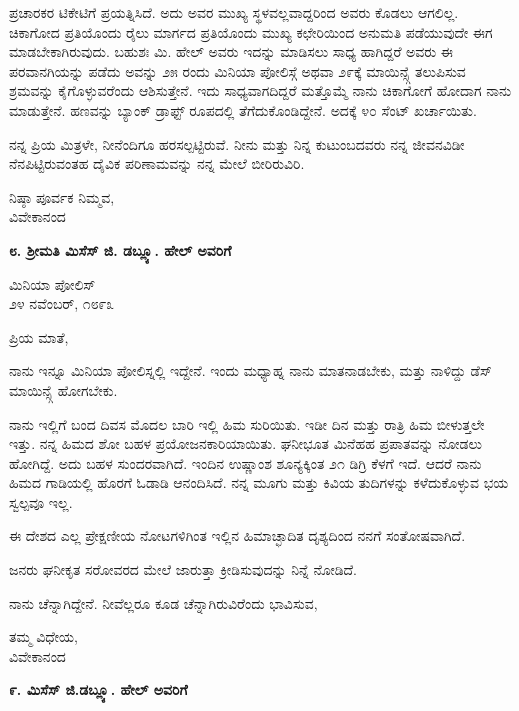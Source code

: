 ಪ್ರಚಾರಕರ ಟಿಕೇಟಿಗೆ ಪ್ರಯತ್ನಿಸಿದೆ. ಅದು ಅವರ ಮುಖ್ಯ ಸ್ಥಳವಲ್ಲವಾದ್ದರಿಂದ ಅವರು ಕೊಡಲು ಆಗಲಿಲ್ಲ. ಚಿಕಾಗೋದ ಪ್ರತಿಯೊಂದು ರೈಲು ಮಾರ್ಗದ ಪ್ರತಿಯೊಂದು ಮುಖ್ಯ ಕಛೇರಿಯಿಂದ ಅನುಮತಿ ಪಡೆಯುವುದೇ ಈಗ ಮಾಡಬೇಕಾಗಿರುವುದು. ಬಹುಶಃ ಮಿ. ಹೇಲ್ ಅವರು ಇದನ್ನು ಮಾಡಿಸಲು ಸಾಧ್ಯ ಹಾಗಿದ್ದರೆ ಅವರು ಈ ಪರವಾನಗಿಯನ್ನು ಪಡೆದು ಅವನ್ನು ೨೫ ರಂದು ಮಿನಿಯಾ ಪೋಲಿಸ್ಗೆ ಅಥವಾ ೨೯ಕ್ಕೆ ಮಾಯಿನ್ಸ್ಗೆ ತಲುಪಿಸುವ ಶ್ರಮವನ್ನು ಕೈಗೊಳ್ಳುವರೆಂದು ಆಶಿಸುತ್ತೇನೆ. ಇದು ಸಾಧ್ಯವಾಗದಿದ್ದರೆ ಮತ್ತೊಮ್ಮೆ ನಾನು ಚಿಕಾಗೋಗೆ ಹೋದಾಗ ನಾನು ಮಾಡುತ್ತೇನೆ. ಹಣವನ್ನು ಬ್ಯಾಂಕ್ ಡ್ರಾಫ್ಟ್ ರೂಪದಲ್ಲಿ ತೆಗೆದುಕೊಂಡಿದ್ದೇನೆ. ಅದಕ್ಕೆ ೪೦ ಸೆಂಟ್ ಖರ್ಚಾಯಿತು.

ನನ್ನ ಪ್ರಿಯ ಮಿತ್ರಳೇ, ನೀನೆಂದಿಗೂ ಹರಸಲ್ಪಟ್ಟಿರುವೆ. ನೀನು ಮತ್ತು ನಿನ್ನ ಕುಟುಂಬದವರು ನನ್ನ ಜೀವನವಿಡೀ ನೆನಪಿಟ್ಟಿರುವಂತಹ ದೈವಿಕ ಪರಿಣಾಮವನ್ನು ನನ್ನ ಮೇಲೆ ಬೀರಿರುವಿರಿ.

\begin{flushright}
ನಿಷ್ಠಾ ಪೂರ್ವಕ ನಿಮ್ಮವ,\\ವಿವೇಕಾನಂದ
\end{flushright}

\begin{center}
\textbf{೮. ಶ‍್ರೀಮತಿ ಮಿಸೆಸ್ ಜಿ. ಡಬ್ಲ್ಯೂ. ಹೇಲ್ ಅವರಿಗೆ}
\end{center}

\begin{flushright}
ಮಿನಿಯಾ ಪೋಲಿಸ್\\೨೪ ನವೆಂಬರ್, ೧೮೯೩
\end{flushright}

ಪ್ರಿಯ ಮಾತೆ,

ನಾನು ಇನ್ನೂ ಮಿನಿಯಾ ಪೋಲಿಸ್ನಲ್ಲಿ ಇದ್ದೇನೆ. ಇಂದು ಮಧ್ಯಾಹ್ನ ನಾನು ಮಾತನಾಡಬೇಕು, ಮತ್ತು ನಾಳಿದ್ದು ಡೆಸ್ ಮಾಯಿನ್ಸ್ಗೆ ಹೋಗಬೇಕು.

ನಾನು ಇಲ್ಲಿಗೆ ಬಂದ ದಿವಸ ಮೊದಲ ಬಾರಿ ಇಲ್ಲಿ ಹಿಮ ಸುರಿಯಿತು. ಇಡೀ ದಿನ ಮತ್ತು ರಾತ್ರಿ ಹಿಮ ಬೀಳುತ್ತಲೇ ಇತ್ತು. ನನ್ನ ಹಿಮದ ಶೋ ಬಹಳ ಪ್ರಯೋಜನಕಾರಿಯಾಯಿತು. ಘನೀಭೂತ ಮಿನೆಹಹ ಪ್ರಪಾತವನ್ನು ನೋಡಲು ಹೋಗಿದ್ದೆ. ಅದು ಬಹಳ ಸುಂದರವಾಗಿದೆ. ಇಂದಿನ ಉಷ್ಣಾಂಶ ಶೂನ್ಯಕ್ಕಿಂತ ೨೧ ಡಿಗ್ರಿ ಕೆಳಗೆ ಇದೆ. ಆದರೆ ನಾನು ಹಿಮದ ಗಾಡಿಯಲ್ಲಿ ಹೊರಗೆ ಓಡಾಡಿ ಆನಂದಿಸಿದೆ. ನನ್ನ ಮೂಗು ಮತ್ತು ಕಿವಿಯ ತುದಿಗಳನ್ನು ಕಳೆದುಕೊಳ್ಳುವ ಭಯ ಸ್ವಲ್ಪವೂ ಇಲ್ಲ.

ಈ ದೇಶದ ಎಲ್ಲ ಪ್ರೇಕ್ಷಣೀಯ ನೋಟಗಳಿಗಿಂತ ಇಲ್ಲಿನ ಹಿಮಾಚ್ಛಾದಿತ ದೃಶ್ಯದಿಂದ ನನಗೆ ಸಂತೋಷವಾಗಿದೆ.

ಜನರು ಘನೀಕೃತ ಸರೋವರದ ಮೇಲೆ ಜಾರುತ್ತಾ ಕ್ರೀಡಿಸುವುದನ್ನು ನಿನ್ನೆ ನೋಡಿದೆ.

ನಾನು ಚೆನ್ನಾಗಿದ್ದೇನೆ. ನೀವೆಲ್ಲರೂ ಕೂಡ ಚೆನ್ನಾಗಿರುವಿರೆಂದು ಭಾವಿಸುವ,

\begin{flushright}
ತಮ್ಮ ವಿಧೇಯ,\\ವಿವೇಕಾನಂದ
\end{flushright}

\begin{center}
\textbf{೯. ಮಿಸೆಸ್ ಜಿ.ಡಬ್ಲ್ಯೂ. ಹೇಲ್ ಅವರಿಗೆ}
\end{center}

